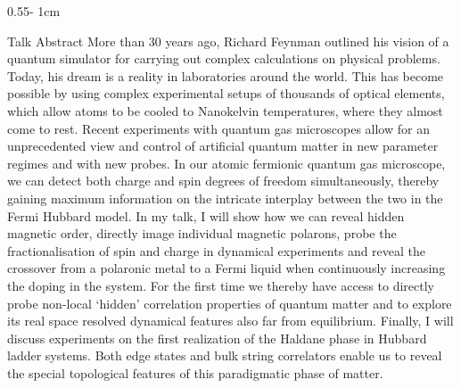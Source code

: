 \documentclass{../psuposter}
\begin{document}
\begin{frame}
\begin{columns}[t, totalwidth=\textwidth]
\begin{column}{0.55\textwidth - 1cm}
    \begin{block}{Talk Abstract}
    	More than 30 years ago, Richard Feynman outlined his vision of a quantum simulator for carrying out complex calculations on physical problems. Today, his dream is a reality in laboratories around the world. This has become possible by using complex experimental setups of thousands of optical elements, which allow atoms to be cooled to Nanokelvin temperatures, where they almost come to rest. Recent experiments with quantum gas microscopes allow for an unprecedented view and control of artificial quantum matter in new parameter regimes and with new probes. In our atomic fermionic quantum gas microscope, we can detect both charge and spin degrees of freedom simultaneously, thereby gaining maximum information on the intricate interplay between the two in the Fermi Hubbard model. In my talk, I will show how we can reveal hidden magnetic order, directly image individual magnetic polarons, probe the fractionalisation of spin and charge in dynamical experiments and reveal the crossover from a polaronic metal to a Fermi liquid when continuously increasing the doping in the system. For the first time we thereby have access to directly probe non-local ‘hidden’ correlation properties of quantum matter and to explore its real space resolved dynamical features also far from equilibrium. Finally, I will discuss experiments on the first realization of the Haldane phase in Hubbard ladder systems. Both edge states and bulk string correlators enable us to reveal the special topological features of this paradigmatic phase of matter.
    \end{block}



\end{column}
\end{columns}
\end{frame}
\end{document}
